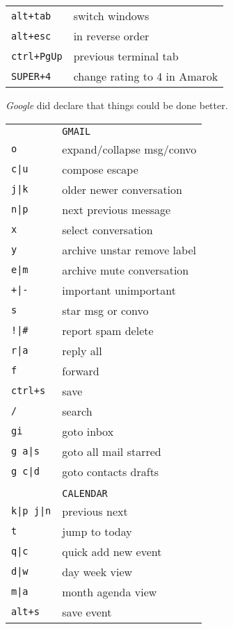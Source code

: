 \begin{tabular}{ll}
\texttt{alt+tab}&switch windows\\
\texttt{alt+esc}&in reverse order\\
\texttt{ctrl+PgUp}&previous terminal tab\\
\texttt{SUPER+4}&change rating to 4 in Amarok\\
\end{tabular}
\vfill
\columnbreak
\emph{Google} did declare that things could be done better.

\bigskip

\begin{tabular}{ll}
&\texttt{GMAIL}\\
\texttt{o}&expand/collapse msg/convo\\
\texttt{c|u}&compose \textbar{} escape\\
\texttt{j|k}&older \textbar{} newer conversation\\
\texttt{n|p}&next \textbar{} previous message\\
\texttt{x}&select conversation\\
\texttt{y}&archive \textbar{} unstar \textbar{} remove label\\
\texttt{e|m}&archive \textbar{} mute conversation\\
\texttt{+|-}&important \textbar{} unimportant\\
\texttt{s}&star msg or convo\\ 
\texttt{!|\#}&report spam \textbar{} delete\\ 
\texttt{r|a}&reply \textbar{} all\\ 
\texttt{f}&forward\\ 
\texttt{ctrl+s}&save\\
\texttt{/}&search\\ 
\texttt{gi}&goto inbox\\
\texttt{g a|s}&goto all mail \textbar{} starred\\ 
\texttt{g c|d}&goto contacts \textbar{} drafts\\ 
&\\
&\texttt{CALENDAR}\\
\texttt{k|p j|n}&previous next\\
\texttt{t}&jump to today\\
\texttt{q|c}&quick add \textbar{} new event\\
\texttt{d|w}&day \textbar{} week view\\
\texttt{m|a}&month \textbar{} agenda view\\
\texttt{alt+s}&save event\\

\end{tabular}
